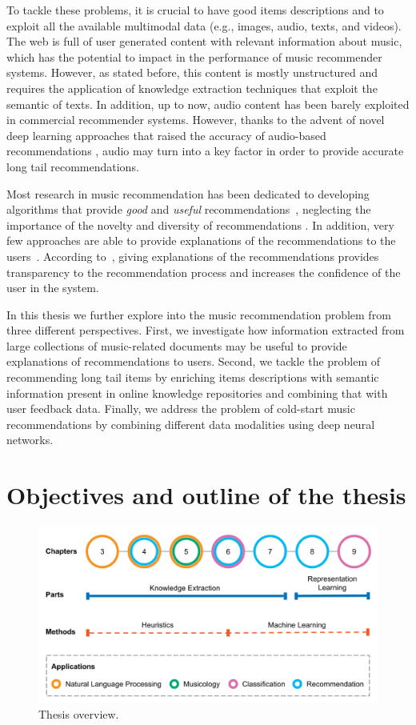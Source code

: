 To tackle these problems, it is crucial to have good items descriptions and to exploit all the available multimodal data (e.g., images, audio, texts, and videos).
The web is full of user generated content with relevant information about music, which has the potential to impact in the performance of music recommender systems. However, as stated before, this content is mostly unstructured and requires the application of knowledge extraction techniques that exploit the semantic of texts.
In addition, up to now, audio content has been barely exploited in commercial recommender systems. However, thanks to the advent of novel deep learning approaches that raised the accuracy of audio-based recommendations \citep{Oord2013}, audio may turn into a key factor in order to provide accurate long tail recommendations.

Most research in music recommendation has been dedicated to developing algorithms that provide \textit{good} and \textit{useful} recommendations~\citep{oscarBook}, neglecting the importance of the novelty and diversity of recommendations \citep{adomavicius2012improving,Bellogin2010}. In addition, very few approaches are able to provide explanations of the recommendations to the users~\citep{Passant2008, Passant2010}. According to~\cite{celma2008new}, giving explanations of the recommendations provides transparency to the recommendation process and increases the confidence of the user in the system.

In this thesis we further explore into the music recommendation problem from three different perspectives. First, we investigate how information extracted from large collections of music-related documents may be useful to provide explanations of recommendations to users. Second, we tackle the problem of recommending long tail items by enriching items descriptions with semantic information present in online knowledge repositories and combining that with user feedback data. Finally, we address the problem of cold-start music recommendations by combining different data modalities using deep neural networks.


\section{Objectives and outline of the thesis}
\label{sec:intro:objectives}

\begin{figure}
	\centering
	\includegraphics[width=\textwidth]{ch01_introduction_pics/Thesis_schema.png}
	\caption{Thesis overview.\label{fig:intro:chapters}}
\end{figure}

